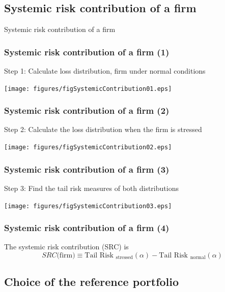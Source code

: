 \documentclass[aspectratio=43,dvipsnames,usenames, svgnames]{beamer}
\begin{document}
\subsection{Systemic risk contribution of a firm}

\begin{frame} %
\begin{center} 
	\Large{Systemic risk contribution of a firm}
\end{center}
\end{frame}

\begin{frame} %
\frametitle{Systemic risk contribution of a firm (1)}
Step 1: Calculate loss distribution, firm under normal conditions
\begin{center}
	\texttt{[image: figures/figSystemicContribution01.eps]}
\end{center}
\end{frame}

\begin{frame} %
\frametitle{Systemic risk contribution of a firm (2)}
Step 2: Calculate the loss distribution when the firm is stressed
\begin{center}
	\texttt{[image: figures/figSystemicContribution02.eps]}
\end{center}
\end{frame}

\begin{frame} %
\frametitle{Systemic risk contribution of a firm (3)}
Step 3: Find the tail risk measures of both distributions
\begin{center}
	\texttt{[image: figures/figSystemicContribution03.eps]}
\end{center}
\end{frame}

\begin{frame} %
\frametitle{Systemic risk contribution of a firm (4)}
\begin{center}
	The systemic risk contribution (SRC) is
	\[
	\boxed{
	SRC \text{(firm)} \equiv \text{Tail Risk }_\text{stressed} (\alpha) -  \text{Tail Risk }_\text{normal}(\alpha)
	} \]
\end{center}
\end{frame}

\subsection{Choice of the reference portfolio}
\end{document}
